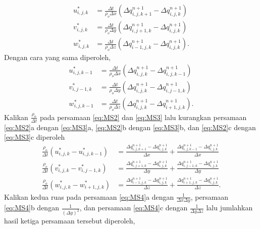 \begin{spacing}{1.5}
	\begin{equation}\label{eq:MS2}
		\begin{aligned}
			u_{i,j,k}^{*} &= \frac{\Delta t}{\rho_o \Delta x}(\Delta q_{i,j,k+1}^{n+1}-\Delta q_{i,j,k}^{n+1}) \\
			v_{i,j,k}^{*} &= \frac{\Delta t}{\rho_o \Delta y}(\Delta q_{i,j+1,k}^{n+1}-\Delta q_{i,j,k}^{n+1})
			\\
			w_{i,j,k}^{*} &= \frac{\Delta t}{\rho_o \Delta z}(\Delta q_{i-1,j,k}^{n+1}-\Delta q_{i,j,k}^{n+1}).
		\end{aligned}
	\end{equation}
	Dengan cara yang sama diperoleh,
	\begin{equation}\label{eq:MS3}
		\begin{aligned}
			u_{i,j,k-1}^{*} &= \frac{\Delta t}{\rho_o \Delta x}(\Delta q_{i,j,k}^{n+1}-\Delta q_{i,j,k-1}^{n+1}) \\
			v_{i,j-1,k}^{*} &= \frac{\Delta t}{\rho_o \Delta y}(\Delta q_{i,j,k}^{n+1}-\Delta q_{i,j-1,k}^{n+1})
			\\
			w_{i,j,k-1}^{*} &= \frac{\Delta t}{\rho_o \Delta z}(\Delta q_{i,j,k}^{n+1}-\Delta q_{i+1,j,k}^{n+1}).
		\end{aligned}
	\end{equation}
	Kalikan $\frac{\rho_o}{\Delta t}$ pada persamaan \ref{eq:MS2} dan \ref{eq:MS3} lalu kurangkan persamaan \ref{eq:MS2}a dengan \ref{eq:MS3}a, \ref{eq:MS2}b dengan \ref{eq:MS3}b, dan \ref{eq:MS2}c dengan \ref{eq:MS3}c diperoleh
	\begin{equation}\label{eq:MS4}
		\begin{aligned}
			\frac{\rho_o}{\Delta t}(u_{i,j,k}^{*}-u_{i,j,k-1}^{*}) &= \frac{\Delta q_{i,j,k+1}^{n+1}-\Delta q_{i,j,k}^{n+1}}{\Delta x} + \frac{\Delta q_{i,j,k-1}^{n+1}-\Delta q_{i,j,k}^{n+1}}{\Delta x} \\
			\frac{\rho_o}{\Delta t}(v_{i,j,k}^{*}-v_{i,j-1,k}^{*}) &= \frac{\Delta q_{i,j+1,k}^{n+1}-\Delta q_{i,j,k}^{n+1}}{\Delta y} + \frac{\Delta q_{i,j-1,k}^{n+1}-\Delta q_{i,j,k}^{n+1}}{\Delta y} \\
			\frac{\rho_o}{\Delta t}(w_{i,j,k}^{*}-w_{i+1,j,k}^{*}) &= \frac{\Delta q_{i-1,j,k}^{n+1}-\Delta q_{i,j,k}^{n+1}}{\Delta z} + \frac{\Delta q_{i+1,j,k}^{n+1}-\Delta q_{i,j,k}^{n+1}}{\Delta z}.
		\end{aligned}
	\end{equation}
	Kalikan kedua ruas pada persamaan \ref{eq:MS4}a dengan $\frac{1}{\Delta x \Delta y}$, persamaan \ref{eq:MS4}b dengan $\frac{1}{(\Delta y)^2}$, dan persamaan \ref{eq:MS4}c dengan $\frac{1}{\Delta y \Delta z}$ lalu jumlahkan hasil ketiga persamaan tersebut diperoleh,

\end{spacing}
